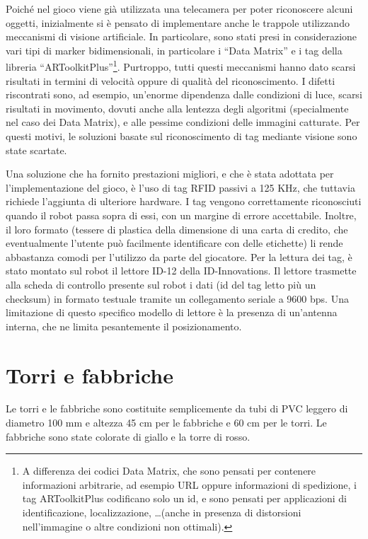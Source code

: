 Poiché nel gioco viene già utilizzata una telecamera per poter riconoscere alcuni oggetti, inizialmente si è pensato di implementare anche le trappole utilizzando meccanismi di visione artificiale. In particolare, sono stati presi in considerazione vari tipi di marker bidimensionali, in particolare i ``Data Matrix'' e i tag della libreria ``ARToolkitPlus''\footnote{A differenza dei codici Data Matrix, che sono pensati per contenere informazioni arbitrarie, ad esempio URL oppure informazioni di spedizione, i tag ARToolkitPlus codificano solo un id, e sono pensati per applicazioni di identificazione, localizzazione, \dots (anche in presenza di distorsioni nell'immagine o altre condizioni non ottimali).}. Purtroppo, tutti questi meccanismi hanno dato scarsi risultati in termini di velocità oppure di qualità del riconoscimento. I difetti riscontrati sono, ad esempio, un'enorme dipendenza dalle condizioni di luce, scarsi risultati in movimento, dovuti anche alla lentezza degli algoritmi (specialmente nel caso dei Data Matrix), e alle pessime condizioni delle immagini catturate. Per questi motivi, le soluzioni basate sul riconoscimento di tag mediante visione sono state scartate.

Una soluzione che ha fornito prestazioni migliori, e che è stata adottata per l'implementazione del gioco, è l'uso di tag RFID passivi a 125 KHz, che tuttavia richiede l'aggiunta di ulteriore hardware. I tag vengono correttamente riconosciuti quando il robot passa sopra di essi, con un margine di errore accettabile. Inoltre, il loro formato (tessere di plastica della dimensione di una carta di credito, che eventualmente l'utente può facilmente identificare con delle etichette) li rende abbastanza comodi per l'utilizzo da parte del giocatore. Per la lettura dei tag, è stato montato sul robot il lettore ID-12 della ID-Innovations. Il lettore trasmette alla scheda di controllo presente sul robot i dati (id del tag letto più un checksum) in formato testuale tramite un collegamento seriale a 9600 bps. Una limitazione di questo specifico modello di lettore è la presenza di un'antenna interna, che ne limita pesantemente il posizionamento.

\section{Torri e fabbriche}
Le torri e le fabbriche sono costituite semplicemente da tubi di PVC leggero di diametro 100 mm e altezza 45  cm per le fabbriche e 60 cm per le torri. Le fabbriche sono state colorate di giallo e la torre di rosso.

